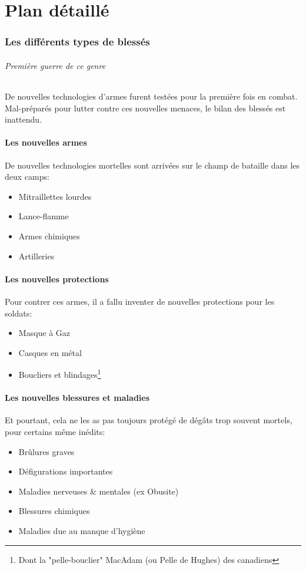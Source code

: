 \documentclass[a4paper, BCOR=0mm, fontsize=12pt, titlepage=firstiscover]{scrreprt}
\begin{document}
	
	\part*{Plan détaillé}
	\newpage
	\section{Les différents types de blessés}
		\paragraph{Première guerre de ce genre}
		De nouvelles technologies d'armes furent testées pour la première fois en combat.
		Mal-préparés pour lutter contre ces nouvelles menaces, le bilan des blessés est inattendu.
	
		\subsection{Les nouvelles armes}
			De nouvelles technologies mortelles sont arrivées sur le champ de bataille dans les deux camps:
			\begin{itemize}
				\item Mitraillettes lourdes
				\item Lance-flamme
				\item Armes chimiques
				\item Artilleries
			\end{itemize}
		\subsection{Les nouvelles protections}
			Pour contrer ces armes, il a fallu inventer de nouvelles protections pour les soldats:
			\begin{itemize}
				\item Masque à Gaz
				\item Casques en métal
				\item Boucliers et blindages\footnote{Dont la "pelle-bouclier" MacAdam (ou Pelle de Hughes) des canadiens}
			\end{itemize}
		\subsection{Les nouvelles blessures et maladies}
			Et pourtant, cela ne les as pas toujours protégé de dégâts trop souvent mortels, pour certains même inédits:
			\begin{itemize}
				\item Brûlures graves
				\item Défigurations importantes 
				\item Maladies nerveuses \& mentales (ex Obusite)
				\item Blessures chimiques
				\item Maladies due au manque d'hygiène
			\end{itemize}
	\newpage
	
\end{document}
